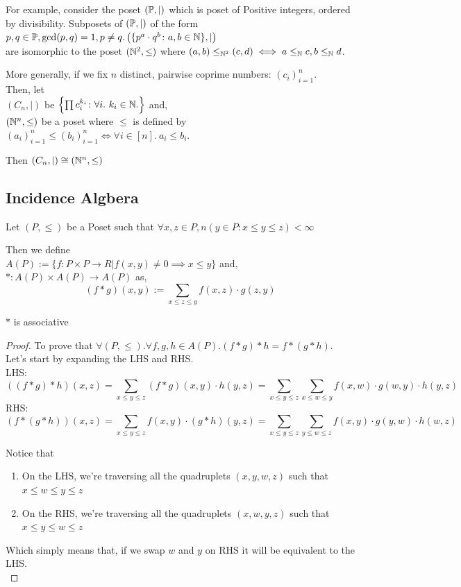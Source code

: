 For example, consider the poset $(\mathbb{P}, |)$ which is poset of Positive
integers, ordered by divisibility.
Subposets of $(\mathbb{P}, |)$ of the form \\
$p, q\in \mathbb{P}, \gcd(p, q) = 1, p \neq q. \left(\{p^a\cdot q^b \colon
a, b \in \mathbb{N} \}, |\right)$\\
are isomorphic to the poset $(\mathbb{N}^2, \le)$ where $(a, b) \le_{\mathbb{N}^2}
(c, d) \iff a \leq_{\mathbb{N}} c, b \leq_{\mathbb{N}} d$.


More generally, if we fix $n$ distinct, pairwise coprime numbers: $(c_i)_{i=1}^n$.\\ 
Then, let\\
$(C_n, |)$ be $\left\{\prod c_i^{k_i} \colon \forall i.~k_i \in \mathbb{N}.\right\}$ and,\\
$(\mathbb{N}^n, \le)$ be a poset where $\le$ is defined by $(a_i)_{i=1}^n
\le (b_i)_{i=1}^n \iff \forall i \in [n].~a_i \le b_i$.

Then $(C_n, |) \cong (\mathbb{N}^n, \le)$

\subsection{Incidence Algbera}
Let $(P, \le)$ be a Poset such that $\forall x, z \in P, n\left({y \in P \colon x \leq y \leq z}\right) < \infty$

Then we define\\
$A(P) := \{f\colon P \times P \to R \left| f(x, y) \neq 0 \implies x \leq y\right.\}$ and,\\
$*: A(P) \times A(P) \to A(P)$ as,
$$(f*g)(x, y) := \sum_{x \leq z \leq y} f(x, z) \cdot g(z, y)$$

\begin{theorem} $*$ is associative\end{theorem}

\begin{proof}
To prove that $\forall (P, \leq). \forall f,g,h \in A(P). (f * g) * h = f * (g * h)$.\\
Let's start by expanding the LHS and RHS.\\
LHS:
$$((f * g) * h)(x, z) = \sum_{x \leq y \leq z} (f * g)(x, y) \cdot h(y, z) = \sum_{x \leq y \leq z}\sum_{x \leq w \leq y}f(x,w)\cdot g(w,y) \cdot h(y,z)$$
RHS:
$$(f * (g * h))(x, z) = \sum_{x \leq y \leq z} f(x, y) \cdot (g * h)(y, z) = \sum_{x \leq y \leq z}\sum_{y \leq w \leq z}f(x,y)\cdot g(y,w) \cdot h(w,z)$$

Notice that\\
\begin{enumerate}
\item { On the LHS, we're traversing all the quadruplets $(x, y, w, z)$ such that $x \leq w \leq y \leq z$}
\item { On the RHS, we're traversing all the quadruplets $(x, w, y, z)$ such that $x \leq y \leq w \leq z$}
\end{enumerate}

Which simply means that, if we swap $w$ and $y$ on RHS it will be equivalent to the LHS.\\
\end{proof}


